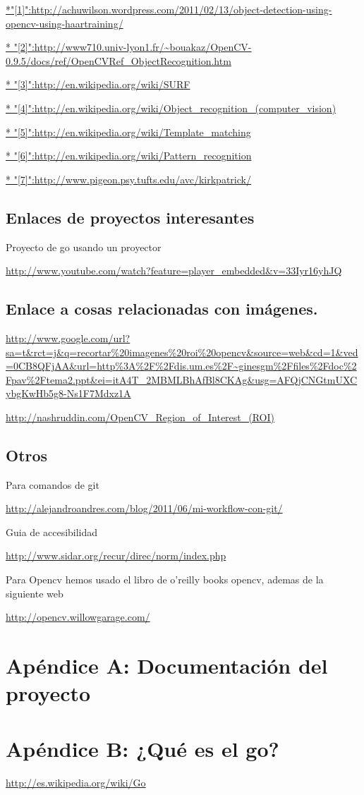 \documentclass[12pt,a4paper]{report}
\begin{document}
\url{*"[1]":http://achuwilson.wordpress.com/2011/02/13/object-detection-using-opencv-using-haartraining/}

\url{* "[2]":http://www710.univ-lyon1.fr/~bouakaz/OpenCV-0.9.5/docs/ref/OpenCVRef_ObjectRecognition.htm}

\url{* "[3]":http://en.wikipedia.org/wiki/SURF}

\url{* "[4]":http://en.wikipedia.org/wiki/Object_recognition_(computer_vision)}

\url{* "[5]":http://en.wikipedia.org/wiki/Template_matching}

\url{* "[6]":http://en.wikipedia.org/wiki/Pattern_recognition}

\url{* "[7]":http://www.pigeon.psy.tufts.edu/avc/kirkpatrick/}

\section{Enlaces de proyectos interesantes}

Proyecto de go usando un proyector

\url{http://www.youtube.com/watch?feature=player_embedded&v=33Iyr16yhJQ}


\section{Enlace a cosas relacionadas con imágenes.} 

\url{http://www.google.com/url?sa=t&rct=j&q=recortar%20imagenes%20roi%20opencv&source=web&cd=1&ved=0CB8QFjAA&url=http%3A%2F%2Fdis.um.es%2F~ginesgm%2Ffiles%2Fdoc%2Fpav%2Ftema2.ppt&ei=itA4T_2MBMLBhAfBl8CKAg&usg=AFQjCNGtmUXCybgKwHb5g8-Ns1F7Mdxz1A}

\url{http://nashruddin.com/OpenCV_Region_of_Interest_(ROI)}

\section{Otros}

Para comandos de git

\url{http://alejandroandres.com/blog/2011/06/mi-workflow-con-git/}

Guia de accesibilidad 

\url{http://www.sidar.org/recur/direc/norm/index.php}

Para Opencv hemos usado el libro de o'reilly books opencv, ademas de la siguiente web

\url{http://opencv.willowgarage.com/}

\chapter{Apéndice A: Documentación del proyecto} 



\chapter{Apéndice B: ¿Qué es el go?} 
\url{http://es.wikipedia.org/wiki/Go}
\end{document}
